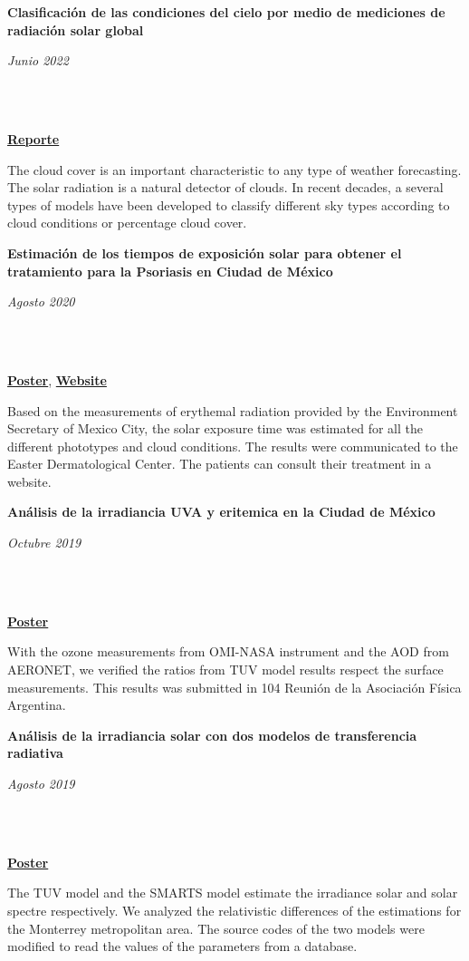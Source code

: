 \documentclass[a3paper]{adcv_color}
\newcommand{\proyect}[3]{\begin{minipage}{1\linewidth}
    \begin{minipage}{0.8\linewidth}
      \textbf{#1}
    \end{minipage}
    \begin{minipage}{0.19\linewidth}
      \begin{flushright}
        \vspace{#3cm}
        \textit{#2}
      \end{flushright}
    \end{minipage}\\
  \end{minipage}
  \vspace{0.1cm}\\
}
\begin{document}
\begin{multicols}{2}
  \proyect{Clasificación de las condiciones del cielo por medio de mediciones de radiación solar global}{Junio 2022}{-0.8}
  \href{https://github.com/giovannilopez9808/Cloud_classification/raw/main/Document/Main.pdf}{\textbf{Reporte}}

  The cloud cover is an important characteristic to any type of weather forecasting. The solar radiation is a natural detector of clouds. In recent decades, a several types of models have been developed to classify different sky types according to cloud conditions or percentage cloud cover.

  \columnbreak

  \proyect{Estimación de los tiempos de exposición solar para obtener el tratamiento para la Psoriasis en Ciudad de México}{Agosto 2020}{-0.2}
  \href{https://github.com/giovannilopez9808/Documents/raw/master/Posters/2020/CNF/TES/main.pdf}{\textbf{Poster}}, \href{http://tes-v1.herokuapp.com/}{\textbf{Website}}

  Based on the measurements of erythemal radiation provided by the Environment Secretary of Mexico City, the solar exposure time was estimated for all the different phototypes and cloud conditions. The results were communicated to the Easter Dermatological Center. The patients can consult their treatment in a website.\\

  \proyect{Análisis de la irradiancia UVA y eritemica en la Ciudad de México}{Octubre 2019}{-0.2}  \href{https://github.com/giovannilopez9808/Documents/raw/master/Posters/2019/AFA/Analisis%20indice%20UV/Analisis%20de%20irradiancia.pdf}{\textbf{Poster}}

    With the ozone measurements from OMI-NASA instrument and the AOD from AERONET, we verified the ratios from TUV model results respect the surface measurements. This results was submitted in 104 Reunión de la Asociación Física Argentina.\\

    \proyect{Análisis de la irradiancia solar con dos modelos de transferencia radiativa}{Agosto 2019}{0}
    \href{https://github.com/giovannilopez9808/Documents/raw/master/Posters/2019/CNF/Transferencia%20radiativa/main.pdf}{\textbf{Poster}}

      The TUV model and the SMARTS model estimate the irradiance solar and solar spectre respectively. We analyzed the relativistic differences of the estimations for the Monterrey metropolitan area. The source codes of the two models were modified to read the values of the parameters from a database.\\



\end{multicols}
\end{document}
